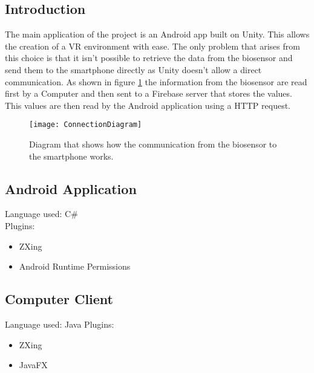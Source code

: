 \subsection{Introduction}
The main application of the project is an Android app built on Unity. This allows the creation of a VR environment with ease. The only problem that arises from this choice is that it isn't possible to retrieve the data from the biosensor and send them to the smartphone directly as Unity doesn't allow a direct communication. As shown in figure \ref{fig:communication} the information from the biosensor are read first by a Computer and then sent to a Firebase server that stores the values. This values are then read by the Android application using a HTTP request.
\begin{figure}[h]
	\centering
	\texttt{[image: ConnectionDiagram]}
	\caption{Diagram that shows how the communication from the biosensor to the smartphone works.}\label{fig:communication}
\end{figure}

\subsection{Android Application}
Language used: C\#\\
Plugins:
\begin{itemize}
	\item ZXing
	\item Android Runtime Permissions
\end{itemize}

\subsection{Computer Client}
Language used: Java
Plugins:
\begin{itemize}
	\item ZXing
	\item JavaFX
\end{itemize}
